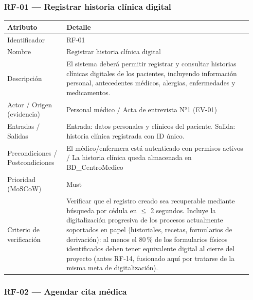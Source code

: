 \documentclass[11pt,a4paper]{article}
\begin{document}
	\subsubsection{RF-01 --- Registrar historia clínica digital}
	
	
	\begin{longtable}{p{} p{}}
		
		\toprule
		\textbf{Atributo} & \textbf{Detalle} \\
		\midrule
		\endhead
		
		Identificador & RF-01 \\		
		Nombre & Registrar historia clínica digital \\		
		Descripción &
		El sistema deberá permitir registrar y consultar historias clínicas digitales de los pacientes, incluyendo información personal, antecedentes médicos, alergias, enfermedades y medicamentos. \\
		Actor / Origen (evidencia) &
		Personal médico / Acta de entrevista N°1 (EV-01) \\		
		Entradas / Salidas &
		Entrada: datos personales y clínicos del paciente. Salida: historia clínica registrada con ID único. \\
		Precondiciones / Postcondiciones &
		El médico/enfermera está autenticado con permisos activos / La historia clínica queda almacenada en BD\_CentroMedico \\
		
		Prioridad (MoSCoW) &		Must \\
		Criterio de verificación &
		Verificar que el registro creado sea recuperable mediante búsqueda por cédula en \(\leq\) 2 segundos. Incluye la digitalización progresiva de los procesos actualmente soportados en papel (historiales, recetas, formularios de derivación): al menos el 80\,\% de los formularios físicos identificados deben tener equivalente digital al cierre del proyecto (antes RF-14, fusionado aquí por tratarse de la misma meta de digitalización). \\
		
		\bottomrule
		
	\end{longtable}
	
	\subsubsection{RF-02 --- Agendar cita médica}
	
\end{document}
